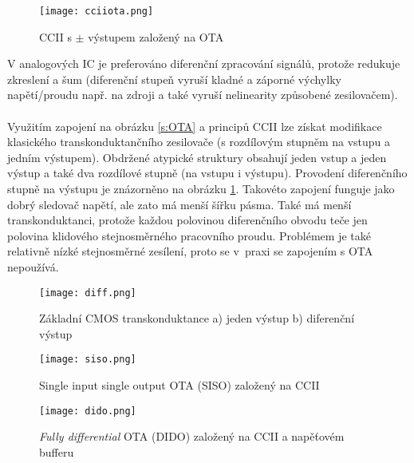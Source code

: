 \begin{figure}[h]
\centering
\texttt{[image: cciiota.png]}
\caption[CCII s $\pm$ výstupem založený na OTA]{CCII s $\pm$ výstupem založený na OTA \cite{15}}
\end{figure}
\newline
V analogových IC je preferováno diferenční zpracování signálů, protože redukuje zkreslení a šum (diferenční stupeň vyruší kladné a záporné výchylky napětí/proudu např. na zdroji a také vyruší nelinearity způsobené zesilovačem).\\
\\
Využitím zapojení na obrázku \ref{s:OTA} a principů CCII lze získat modifikace klasického transkonduktančního zesilovače (s rozdílovým stupněm na vstupu a jedním výstupem). Obdržené atypické struktury obsahují jeden vstup a jeden výstup a také dva rozdílové stupně (na vstupu i výstupu). Provodení diferenčního stupně na výstupu je znázorněno na obrázku \ref{s:CMOS}. Takovéto zapojení funguje jako dobrý sledovač napětí, ale zato má menší šířku pásma. Také má menší transkonduktanci, protože každou polovinou diferenčního obvodu teče jen polovina klidového stejnosměrného pracovního proudu. Problémem je také relativně nízké stejnosměrné zesílení, proto se v~praxi se zapojením s OTA nepoužívá. \\
\begin{figure}[h]
\centering
\texttt{[image: diff.png]}
\caption[Základní CMOS transkonduktance a) jeden výstup b) diferenční výstup]{Základní CMOS transkonduktance a) jeden výstup b) diferenční výstup \cite{13} \label{s:CMOS}}
\end{figure}
\begin{figure}[h]
\centering
\texttt{[image: siso.png]}
\caption[Single input single output OTA (SISO) založený na CCII]{Single input single output OTA (SISO) založený na CCII \cite{15}}
\end{figure}
\begin{figure}[h]
\centering
\texttt{[image: dido.png]}
\caption[\textit{Fully differential} OTA (DIDO) založený na CCII a napěťovém bufferu]{\textit{Fully differential} OTA (DIDO) založený na CCII a napěťovém bufferu \cite{15}}
\end{figure}
\newpage
